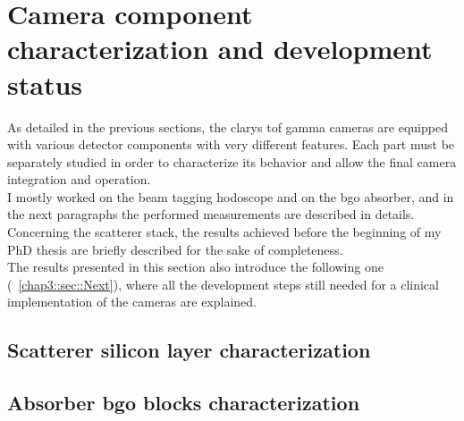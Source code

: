 \newpage


\section{Camera component characterization and development status}\label{chap3::sec::charMeasurements}

As detailed in the previous sections, the \gls{clarys} \gls{tof} gamma cameras are equipped with various detector components with very different features. Each part must be separately studied in order to characterize its behavior and allow the final camera integration and operation.\\
I mostly worked on the beam tagging hodoscope and on the \gls{bgo} absorber, and in the next paragraphs the performed measurements are described in details. Concerning the scatterer stack, the results achieved before the beginning of my PhD thesis are briefly described for the sake of completeness.\\
The results presented in this section also introduce the following one (~\ref{chap3::sec::Next}), where all the development steps still needed for a clinical implementation of the cameras are explained.\\

\subsection{Scatterer silicon layer characterization}\label{chap3::subsec::scattSichar}


\newpage

\subsection{Absorber \gls{bgo} blocks characterization}\label{chap3::subsec::absBGOchar}

